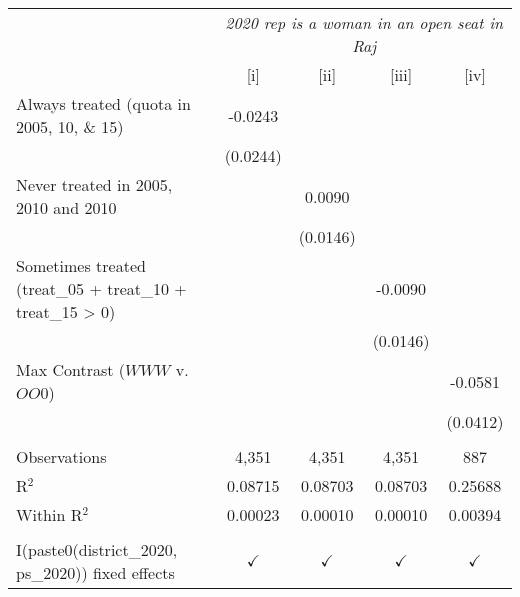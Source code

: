 
\begingroup
\centering
\begin{tabular}{lcccc}
   \toprule
    & \multicolumn{4}{c}{\textit{2020 rep is a woman in an open seat in Raj}}\\
                                                                & [i]           & [ii]          & [iii]         & [iv]\\  
   \midrule 
   Always treated (quota in 2005, 10, \& 15)                    & -0.0243       &               &               &   \\   
                                                                & (0.0244)      &               &               &   \\   
   Never treated in 2005, 2010 and 2010                         &               & 0.0090        &               &   \\   
                                                                &               & (0.0146)      &               &   \\   
   Sometimes treated (treat\_05 + treat\_10 + treat\_15 > 0)    &               &               & -0.0090       &   \\   
                                                                &               &               & (0.0146)      &   \\   
    Max Contrast ($WWW$ v. $OO0$)                               &               &               &               & -0.0581\\   
                                                                &               &               &               & (0.0412)\\   
    \\
   Observations                                                 & 4,351         & 4,351         & 4,351         & 887\\  
   R$^2$                                                        & 0.08715       & 0.08703       & 0.08703       & 0.25688\\  
   Within R$^2$                                                 & 0.00023       & 0.00010       & 0.00010       & 0.00394\\  
    \\
   I(paste0(district\_2020, ps\_2020)) fixed effects            & $\checkmark$  & $\checkmark$  & $\checkmark$  & $\checkmark$\\   
   \bottomrule
\end{tabular}
\par\endgroup


